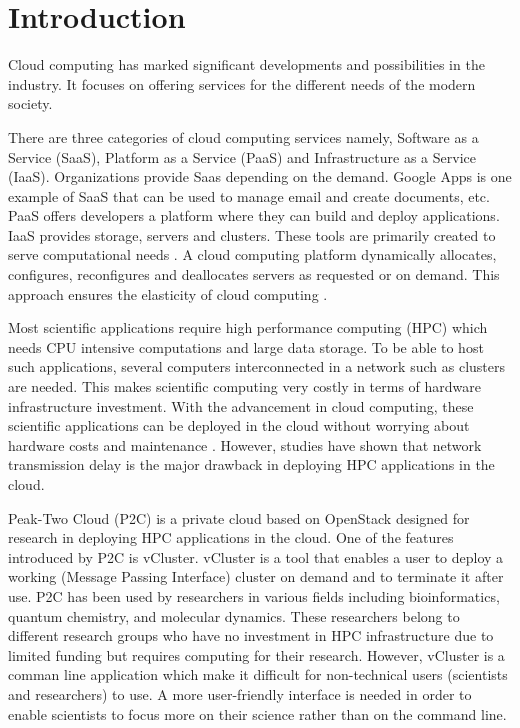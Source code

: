\section{Introduction}

Cloud computing has marked significant developments and possibilities in the industry. It focuses on offering services for the different needs of the modern society.


There are three categories of cloud computing services namely, Software as a Service (SaaS), Platform as a Service (PaaS) and Infrastructure as a Service (IaaS). Organizations provide Saas depending on the demand. Google Apps is one example of SaaS that can be used to manage email and create documents, etc. PaaS offers developers a platform where they can build and deploy applications. IaaS provides storage, servers and clusters. These tools are primarily created to serve computational needs \cite {Ahuja2012}. A cloud computing platform dynamically allocates, configures, reconfigures and deallocates servers as requested or on demand. This approach ensures the elasticity of cloud computing \cite {Brandic2011}.


Most scientific applications require high performance computing (HPC) which needs CPU intensive computations and large data storage. To be able to host such applications, several computers interconnected in a network such as clusters are needed. This makes scientific computing very costly in terms of hardware infrastructure investment. With the advancement in cloud computing, these scientific applications  can be deployed in the cloud without worrying about hardware costs and maintenance \cite {Ahuja2012}. However, studies have shown that network transmission delay is the major drawback in deploying HPC applications in the cloud\cite {Brandic2011}. 


Peak-Two Cloud (P2C) is a private cloud based on OpenStack designed for research in deploying HPC applications in the cloud\cite {Hermocilla2014}. One of the features introduced by P2C is vCluster. vCluster is a tool that enables a user to deploy a working (Message Passing Interface) cluster on demand and to terminate it after use. P2C has been used by researchers in various fields including bioinformatics, quantum chemistry, and molecular dynamics. These researchers belong to different research groups who have no investment in HPC infrastructure due to limited funding but requires computing for their research. However, vCluster is a comman line application which make it difficult for non-technical users (scientists and researchers) to use. A more user-friendly interface is needed in order to enable scientists to focus more on their science rather than on the command line.

